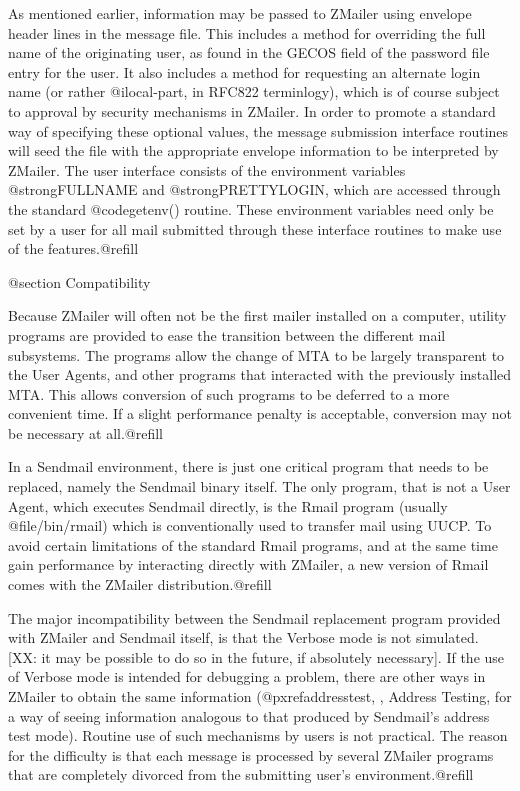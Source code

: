 As mentioned earlier, information may be passed to ZMailer using
envelope header lines in the message file.  This includes a method for
overriding the full name of the originating user, as found in the GECOS
field of the password file entry for the user.  It also includes a
method for requesting an alternate login name (or rather
@i{local-part}, in RFC822 terminlogy), which is of course subject to
approval by security mechanisms in ZMailer.  In order to promote a
standard way of specifying these optional values, the message
submission interface routines will seed the file with the appropriate
envelope information to be interpreted by ZMailer.  The user interface
consists of the environment variables @strong{FULLNAME} and
@strong{PRETTYLOGIN}, which are accessed through the standard
@code{getenv()} routine.  These environment variables need only be set
by a user for all mail submitted through these interface routines to
make use of the features.@refill

@section Compatibility

Because ZMailer will often not be the first mailer installed on a computer,
utility programs are provided to ease the transition between the
different mail subsystems.  The programs allow the change of MTA to be
largely transparent to the User Agents, and other programs that
interacted with the previously installed MTA.  This allows conversion of
such programs to be deferred to a more convenient time.  If a slight
performance penalty is acceptable, conversion may not be necessary
at all.@refill

In a Sendmail environment, there is just one critical program that needs
to be replaced, namely the Sendmail binary itself.  The only program, that is
not a User Agent, which executes Sendmail directly, is the Rmail program
(usually @file{/bin/rmail}) which is conventionally used to transfer mail
using UUCP.  To avoid certain limitations of the standard Rmail programs,
and at the same time gain performance by interacting directly with ZMailer,
a new version of Rmail comes with the ZMailer distribution.@refill

The major incompatibility between the Sendmail replacement program provided
with ZMailer and Sendmail itself, is that the Verbose mode is not simulated.
[XX: it may be possible to do so in the future, if absolutely necessary].
If the use of Verbose mode is intended for debugging a problem, there are
other ways in ZMailer to obtain the same information
(@pxref{addresstest, , Address Testing}, for a way of seeing information
analogous to that produced by Sendmail's address test mode).
Routine use of such mechanisms by users is not practical.  The reason for
the difficulty is that each message is processed by several ZMailer programs
that are completely divorced from the submitting user's environment.@refill

